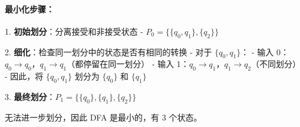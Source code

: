 \documentclass{article}
\begin{document}
\paragraph{最小化步骤：}

1. \textbf{初始划分}：分离接受和非接受状态
   - $P_0 = \{\{q_0, q_1\}, \{q_2\}\}$

2. \textbf{细化}：检查同一划分中的状态是否有相同的转换
   - 对于 $\{q_0, q_1\}$：
     - 输入 0：$q_0 \rightarrow q_0$，$q_1 \rightarrow q_1$（都停留在同一划分）
     - 输入 1：$q_0 \rightarrow q_1$，$q_1 \rightarrow q_2$（不同划分）
   - 因此，将 $\{q_0, q_1\}$ 划分为 $\{q_0\}$ 和 $\{q_1\}$

3. \textbf{最终划分}：$P_1 = \{\{q_0\}, \{q_1\}, \{q_2\}\}$

无法进一步划分，因此 DFA 是最小的，有 3 个状态。
\end{document}
